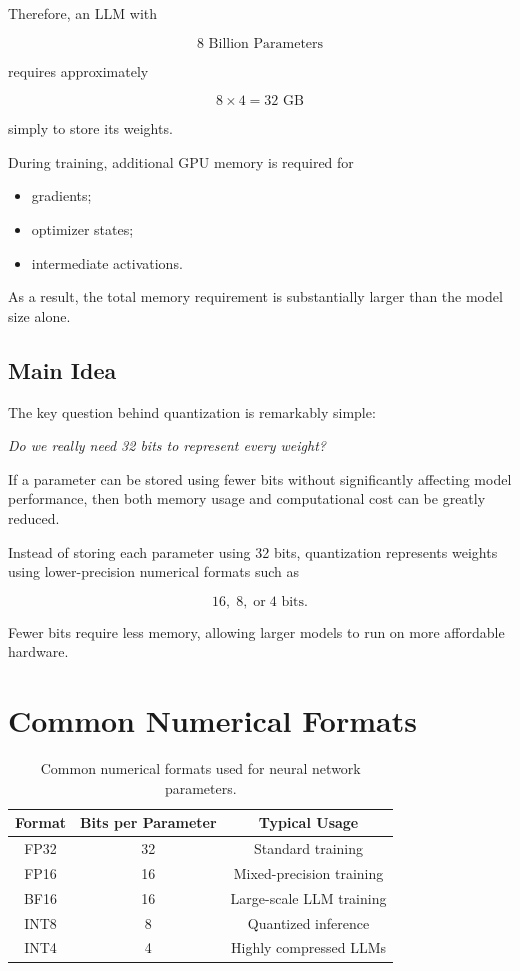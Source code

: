Therefore, an LLM with

\[
8\text{ Billion Parameters}
\]

requires approximately

\[
8\times4
=
32\text{ GB}
\]

simply to store its weights.

During training, additional GPU memory is required for

\begin{itemize}
    \item gradients;
    \item optimizer states;
    \item intermediate activations.
\end{itemize}

As a result, the total memory requirement is substantially larger than the model size alone.
\subsection*{Main Idea}

The key question behind quantization is remarkably simple:

\begin{center}
\emph{Do we really need 32 bits to represent every weight?}
\end{center}

If a parameter can be stored using fewer bits without significantly affecting model performance, then both memory usage and computational cost can be greatly reduced.

Instead of storing each parameter using 32 bits, quantization represents weights using lower-precision numerical formats such as

\[
16,\;
8,\;
\text{or}
\;
4
\text{ bits}.
\]

Fewer bits require less memory, allowing larger models to run on more affordable hardware.
\section{Common Numerical Formats}

\begin{table}[H]
\centering
\caption{Common numerical formats used for neural network parameters.}
\label{tab:numerical_formats}

\renewcommand{\arraystretch}{1.25}

\begin{tabular}{ccc}
\toprule
\textbf{Format} &
\textbf{Bits per Parameter} &
\textbf{Typical Usage} \\
\midrule
FP32 & 32 & Standard training \\
FP16 & 16 & Mixed-precision training \\
BF16 & 16 & Large-scale LLM training \\
INT8 & 8 & Quantized inference \\
INT4 & 4 & Highly compressed LLMs \\
\bottomrule
\end{tabular}

\end{table}
